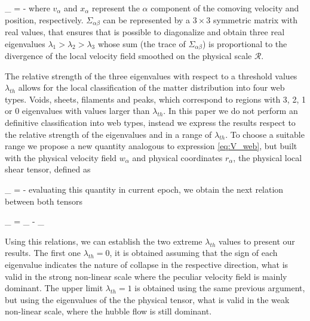\documentclass[usenatbib]{latex/mn2e}
\begin{document}
{
\Sigma_{\alpha\beta} = -
}
where $v_{\alpha}$ and $x_{\alpha}$ represent the $\alpha$ component of 
the comoving velocity and position, respectively. $\Sigma_{\alpha\beta}$ 
can be represented by a $3\times 3$ symmetric matrix with real values, 
that ensures that is possible to diagonalize and obtain three real 
eigenvalues $\lambda_{1} > \lambda_{2}>\lambda_3$ whose sum (the trace of
$\Sigma_{\alpha\beta}$) is proportional to the divergence of the local 
velocity field smoothed on the physical scale ${\mathcal R}$. 


The relative strength of the three eigenvalues with respect to a threshold
values $\lambda_{th}$ allows for the local classification of the matter 
distribution into four web types. Voids, sheets, filaments and peaks, 
which correspond to regions with 3, 2, 1 or 0 eigenvalues with values 
larger than $\lambda_{th}$. In this paper we do not perform an definitive 
classification into web types, instead we express the results respect to 
the relative strength of the eigenvalues and in a range of $\lambda_{th}$.
To choose a suitable range we propose a new quantity analogous to 
expression \ref{eq:V_web}, but built with the physical velocity field 
$w_{\alpha}$ and physical coordinates $r_{\alpha}$, the physical local 
shear tensor, defined as 


{
\Pi_{\alpha\beta} = -
}
evaluating this quantity in current epoch, we obtain the next relation 
between both tensors


{ \Pi_{\alpha\beta} = \Sigma_{\alpha\beta} - \delta_{\alpha\beta} }


Using this relations, we can establish the two extreme $\lambda_{th}$ 
values to present our results. The first one $\lambda_{th} = 0$, it is 
obtained assuming that the sign of each eigenvalue indicates the nature of
collapse in the respective direction, what is valid in the strong 
non-linear scale where the peculiar velocity field is mainly dominant. 
The upper limit $\lambda_{th} = 1$ is obtained using the same previous 
argument, but using the eigenvalues of the the physical tensor, what is 
valid in the weak non-linear scale, where the hubble flow is still 
dominant.
\end{document}
